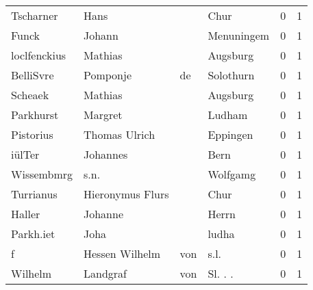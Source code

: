 \documentclass[10pt,a4paper,landscape]{article}
\begin{document}
\begin{longtable}{llllrr}
                Tscharner &                               Hans &             &                                        Chur &          0 &         1 \\
                    Funck &                             Johann &             &                                  Menuningem &          0 &         1 \\
             loclfenckius &                            Mathias &             &                                    Augsburg &          0 &         1 \\
                BelliSvre &                           Pomponje &          de &                                   Solothurn &          0 &         1 \\
                  Scheaek &                            Mathias &             &                                    Augsburg &          0 &         1 \\
                Parkhurst &                            Margret &             &                                      Ludham &          0 &         1 \\
                Pistorius &                      Thomas Ulrich &             &                                    Eppingen &          0 &         1 \\
                   iülTer &                           Johannes &             &                                        Bern &          0 &         1 \\
               Wissembmrg &                               s.n. &             &                                    Wolfgamg &          0 &         1 \\
                Turrianus &                   Hieronymus Flurs &             &                                        Chur &          0 &         1 \\
                   Haller &                            Johanne &             &                                       Herrn &          0 &         1 \\
                Parkh.iet &                               Joha &             &                                       ludha &          0 &         1 \\
                        f &                     Hessen Wilhelm &         von &                                        s.l. &          0 &         1 \\
                  Wilhelm &                           Landgraf &         von &                                    Sl. . .  &          0 &         1 \\

\end{longtable}
\end{document}
